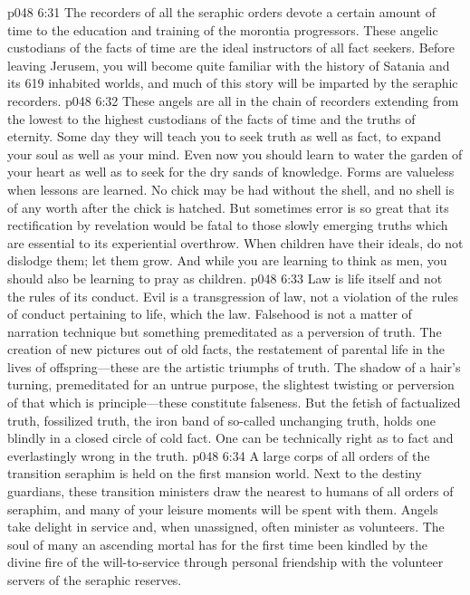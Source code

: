 \vs p048 6:31 The recorders of all the seraphic orders devote a certain amount of time to the education and training of the morontia progressors. These angelic custodians of the facts of time are the ideal instructors of all fact seekers. Before leaving Jerusem, you will become quite familiar with the history of Satania and its 619 inhabited worlds, and much of this story will be imparted by the seraphic recorders.
\vs p048 6:32 These angels are all in the chain of recorders extending from the lowest to the highest custodians of the facts of time and the truths of eternity. Some day they will teach you to seek truth as well as fact, to expand your soul as well as your mind. Even now you should learn to water the garden of your heart as well as to seek for the dry sands of knowledge. Forms are valueless when lessons are learned. No chick may be had without the shell, and no shell is of any worth after the chick is hatched. But sometimes error is so great that its rectification by revelation would be fatal to those slowly emerging truths which are essential to its experiential overthrow. When children have their ideals, do not dislodge them; let them grow. And while you are learning to think as men, you should also be learning to pray as children.
\vs p048 6:33 Law is life itself and not the rules of its conduct. Evil is a transgression of law, not a violation of the rules of conduct pertaining to life, which  the law. Falsehood is not a matter of narration technique but something premeditated as a perversion of truth. The creation of new pictures out of old facts, the restatement of parental life in the lives of offspring---these are the artistic triumphs of truth. The shadow of a hair’s turning, premeditated for an untrue purpose, the slightest twisting or perversion of that which is principle---these constitute falseness. But the fetish of factualized truth, fossilized truth, the iron band of so\hyp{}called unchanging truth, holds one blindly in a closed circle of cold fact. One can be technically right as to fact and everlastingly wrong in the truth.
\pc \vs p048 6:34 \bibnobreakspace {} A large corps of all orders of the transition seraphim is held on the first mansion world. Next to the destiny guardians, these transition ministers draw the nearest to humans of all orders of seraphim, and many of your leisure moments will be spent with them. Angels take delight in service and, when unassigned, often minister as volunteers. The soul of many an ascending mortal has for the first time been kindled by the divine fire of the will\hyp{}to\hyp{}service through personal friendship with the volunteer servers of the seraphic reserves.
